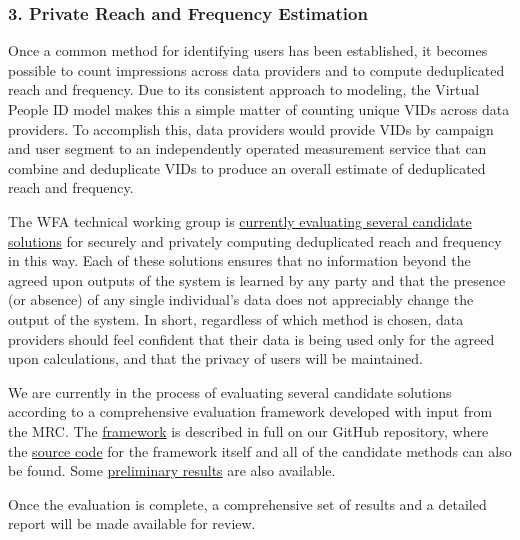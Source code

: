 \documentclass[]{article}
\begin{document}
\subsubsection{3. Private Reach and Frequency Estimation}

Once a common method for identifying users has been established, it becomes possible to count impressions across data providers and to compute deduplicated reach and frequency. Due to its consistent approach to modeling, the Virtual People ID model makes this a simple matter of counting unique VIDs across data providers. To accomplish this, data providers would provide VIDs by campaign and user segment to an independently operated measurement service that can combine and deduplicate VIDs to produce an overall estimate of deduplicated reach and frequency.

The WFA technical working group is \href{https://github.com/world-federation-of-advertisers/cardinality_estimation_evaluation_framework/blob/master/doc/cardinality_and_frequency_estimation_evaluation_framework.md}{currently evaluating several candidate solutions} for securely and privately computing deduplicated reach and frequency in this way. Each of these
solutions ensures that no information beyond the agreed upon outputs of the system is learned by any party and that the presence (or absence) of any single individual's data does not appreciably change the output of the system. In short, regardless of which method is chosen, data providers should feel confident that their data is being used only for the agreed upon calculations, and that the privacy of users will be
maintained.

We are currently in the process of evaluating several candidate solutions according to a comprehensive evaluation framework developed with input from the MRC. The \href{https://github.com/world-federation-of-advertisers/cardinality_estimation_evaluation_framework/blob/master/doc/cardinality_and_frequency_estimation_evaluation_framework.md}{framework} is described in full on our GitHub repository, where the \href{https://github.com/world-federation-of-advertisers/cardinality_estimation_evaluation_framework}{source code} for the framework itself and all of the candidate methods can also be found. Some \href{https://github.com/world-federation-of-advertisers/cardinality_estimation_evaluation_framework/tree/master/results}{preliminary results} are also available.

Once the evaluation is complete, a comprehensive set of results and a detailed report will be made available for review.
\end{document}
